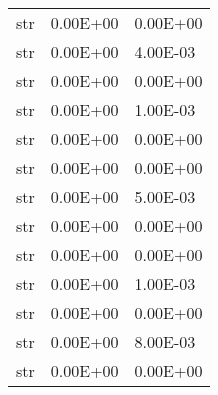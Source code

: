 \begin{appendices}
\begin{center}
\begin{longtable}{|l|l|l|}
str                           & 0.00E+00      & 0.00E+00        \\
str                           & 0.00E+00      & 4.00E-03        \\
str                           & 0.00E+00      & 0.00E+00        \\
str                           & 0.00E+00      & 1.00E-03        \\
str                           & 0.00E+00      & 0.00E+00        \\
str                           & 0.00E+00      & 0.00E+00        \\
str                           & 0.00E+00      & 5.00E-03        \\
str                           & 0.00E+00      & 0.00E+00        \\
str                           & 0.00E+00      & 0.00E+00        \\
str                           & 0.00E+00      & 1.00E-03        \\
str                           & 0.00E+00      & 0.00E+00        \\
str                           & 0.00E+00      & 8.00E-03        \\
str                           & 0.00E+00      & 0.00E+00  		\\  
\end{longtable}
\end{center}

\end{appendices}